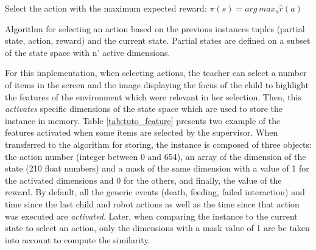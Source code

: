 \begin{algorithm}
	\DontPrintSemicolon
	Select the action with the maximum expected reward:
	$\pi(s) = arg\, max_{a} \hat{r}(a)$
	
	
	\caption{Algorithm for selecting an action based on the previous instances tuples (partial state, action, reward) and the current state. Partial states are defined on a subset of the state space with n' active dimensions.}
	\label{algo:tuto}
\end{algorithm}

For this implementation, when selecting actions, the teacher can select a number of items in the screen and the image displaying the focus of the child to highlight the features of the environment which were relevant in her selection. Then, this \emph{activates} specific dimensions of the state space which are used to store the instance in memory. Table \ref{tab:tuto_feature} presents two example of the features activated when some items are selected by the supervisor. When transferred to the algorithm for storing, the instance is composed of three objects: the action number (integer between 0 and 654), an array of the dimension of the state (210 float numbers) and a mask of the same dimension with a value of 1 for the activated dimensions and 0 for the others, and finally, the value of the reward. By default, all the generic events (death, feeding, failed interaction) and time since the last child and robot actions as well as the time since that action was executed are \emph{activated}. Later, when comparing the instance to the current state to select an action, only the dimensions with a mask value of 1 are be taken into account to compute the similarity.


